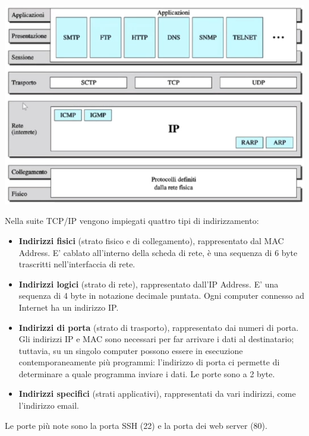         \begin{center}
            \includegraphics[scale=0.5]{images/TCP-Synth.png}
        \end{center}
    
        \vspace{3mm}
    
        Nella suite TCP/IP vengono impiegati quattro tipi di indirizzamento:
    
        \begin{itemize}
            \item 
                \textbf{Indirizzi fisici} (strato fisico e di collegamento), rappresentato dal MAC Address. E' cablato all'interno della scheda di rete, è una sequenza di 6 byte trascritti nell'interfaccia di rete.
            
            \item
                \textbf{Indirizzi logici} (strato di rete), rappresentato dall'IP Address. E' una sequenza di 4 byte in notazione decimale puntata. Ogni computer connesso ad Internet ha un indirizzo IP.
            
            \item
                \textbf{Indirizzi di porta} (strato di trasporto), rappresentato dai numeri di porta. Gli indirizzi IP e MAC sono necessari per far arrivare i dati al destinatario; tuttavia, su un singolo computer possono essere in esecuzione contemporaneamente più programmi: l'indirizzo di porta ci permette di determinare a quale programma inviare i dati. Le porte sono a 2 byte.
            
            \item
                \textbf{Indirizzi specifici} (strati applicativi), rappresentati da vari indirizzi, come l'indirizzo email.
        \end{itemize}

        Le porte più note sono la porta SSH (22) e la porta dei web server (80).
